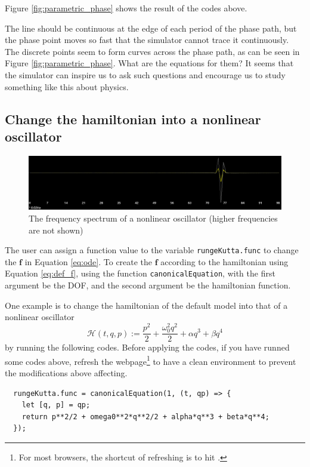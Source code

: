 \documentclass[12pt]{article}
\begin{document}
Figure \ref{fig:parametric_phase} shows the result of the codes above.

The line should be continuous at the edge of each period of the phase path,
but the phase point moves so fast that the simulator cannot trace it continuously.
The discrete points seem to form curves across the phase path,
as can be seen in Figure \ref{fig:parametric_phase}.
What are the equations for them?
It seems that the simulator can inspire us to ask such questions
and encourage us to study something like this about physics.

\subsection{Change the hamiltonian into a nonlinear oscillator}

\begin{figure}
  \centering
  \includegraphics[width=0.9\linewidth]{nonlinear_frequency.png}
  \caption{The frequency spectrum of a nonlinear oscillator (higher frequencies are not shown)}
  \label{fig:nonlinear}
\end{figure}

The user can assign a function value to the variable \texttt{rungeKutta.func}
to change the $\mathbf f$ in Equation \ref{eq:ode}.
To create the $\mathbf f$ according to the hamiltonian using Equation \ref{eq:def_f},
using the function \texttt{canonicalEquation},
with the first argument be the DOF, and the second argument be the hamiltonian function.

One example is to change the hamiltonian of the default model into that of a nonlinear oscillator
\begin{equation*}
  \mathcal H\left(t,q,p\right):=\frac{p^2}2+\frac{\omega_0^2q^2}2+\alpha q^3+\beta q^4
\end{equation*}
by running the following codes.
Before applying the codes, if you have runned some codes above,
refresh the webpage\footnote{
  For most browsers, the shortcut of refreshing is to hit .
} to have a clean environment to prevent the modifications above affecting.

\begin{verbatim}
  rungeKutta.func = canonicalEquation(1, (t, qp) => {
    let [q, p] = qp;
    return p**2/2 + omega0**2*q**2/2 + alpha*q**3 + beta*q**4;
  });
\end{verbatim}
\end{document}
